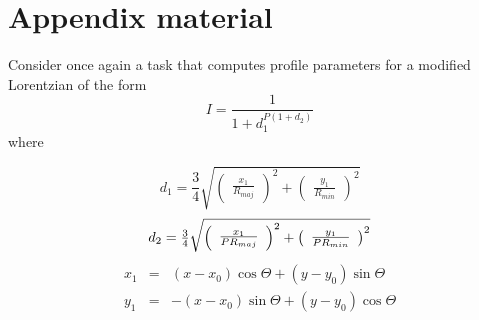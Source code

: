 \documentclass[manuscript]{aastex}
\begin{document}


\appendix

\section{Appendix material}

Consider once again a task that computes profile parameters for a modified
Lorentzian of the form
\begin{equation}
I = \frac{1}{1 + d_{1}^{P (1 + d_{2} )}}
\end{equation}
where
\begin{mathletters}
\begin{displaymath}
d_{1} = \frac{3}{4} \sqrt{ \left( \begin{array}{c} \frac{x_{1}}{R_{maj}}
\end{array} \right) ^{2} +
\left( \begin{array}{c} \frac{y_{1}}{R_{min}} \end{array} \right) ^{2} }
\end{displaymath}
\begin{equation}
d_{2} = \mbox{$\frac{3}{4}$} \sqrt{ \left( \begin{array}{c} \frac{x_{1}}{P R_{maj}}
\end{array} \right) ^{2} +
\left( \begin{array}{c} \mbox{$\frac{y_{1}}{P R_{min}}$} \end{array} \right) ^{2} }
\end{equation}
\begin{eqnarray}
x_{1} & = & (x - x_{0}) \cos \Theta + (y - y_{0}) \sin \Theta \\
y_{1} & = & -(x - x_{0}) \sin \Theta + (y - y_{0}) \cos \Theta
\end{eqnarray}
\end{mathletters}
\end{document}
